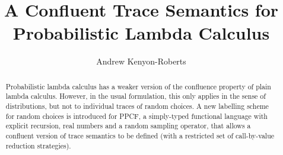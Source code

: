 \documentclass[conference]{IEEEtran}
\begin{document}
\title{A Confluent Trace Semantics for Probabilistic Lambda Calculus}

\author{Andrew Kenyon-Roberts}

\maketitle

\begin{abstract}
Probabilistic lambda calculus has a weaker version of the confluence property of plain lambda calculus. However, in the usual formulation, this only applies in the sense of distributions, but not to individual traces of random choices. A new labelling scheme for random choices is introduced for PPCF, a simply-typed functional language with explicit recursion, real numbers and a random sampling operator, that allows a confluent version of trace semantics to be defined (with a restricted set of call-by-value reduction strategies).
\end{abstract}

\IEEEpeerreviewmaketitle









\end{document}
